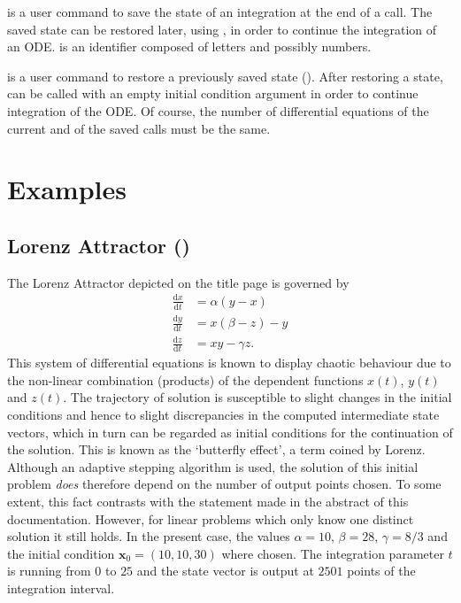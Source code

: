 \documentclass[11pt,english,BCOR10mm,DIV12,bibliography=totoc,parskip=false,smallheadings
    headexclude,footexclude,oneside,dvips,UKenglish]{pst-doc}
\begin{document}
\begin{BDef}
\end{BDef}
is a user command to save the state of an integration at the end of a  call. The saved state can be restored later, using , in order to continue the integration of an ODE.  is an identifier composed of letters and possibly numbers.\\[1ex]

\begin{BDef}
\end{BDef}
is a user command to restore a previously saved state (). After restoring a state,  can be called with an empty initial condition argument in order to continue integration of the ODE. Of course, the number of differential equations of the current and of the saved  calls must be the same.

\section{Examples}
\subsection[Lorenz Attractor]{Lorenz Attractor ()}
The Lorenz Attractor depicted on the title page is governed by
\begin{align*}
  \frac{\mathrm{d}x}{\mathrm{d}t}& = \alpha (y-x)\\
  \frac{\mathrm{d}y}{\mathrm{d}t}& = x(\beta-z)-y\\
  \frac{\mathrm{d}z}{\mathrm{d}t}& = x y - \gamma z.
\end{align*}
This system of differential equations is known to display chaotic behaviour due to the non-linear combination (products) of the dependent functions $x(t)$, $y(t)$ and $z(t)$. The trajectory of solution is susceptible to slight changes in the initial conditions and hence to slight discrepancies in the computed intermediate state vectors, which in turn can be regarded as initial conditions for the continuation of the solution. This is known as the `butterfly effect', a term coined by Lorenz. Although an adaptive stepping algorithm is used, the solution of this initial problem \emph{does} therefore depend on the number of output points chosen. To some extent, this fact contrasts with the statement made in the abstract of this documentation. However, for linear problems which only know one distinct solution it still holds. In the present case, the values $\alpha=10$, $\beta=28$, $\gamma=8/3$ and the initial condition $\mathbf{x}_0=(10,10,30)$ where chosen. The integration parameter $t$ is running from  $0$ to $25$ and the state vector is output at $2501$ points of the integration interval.
\end{document}
